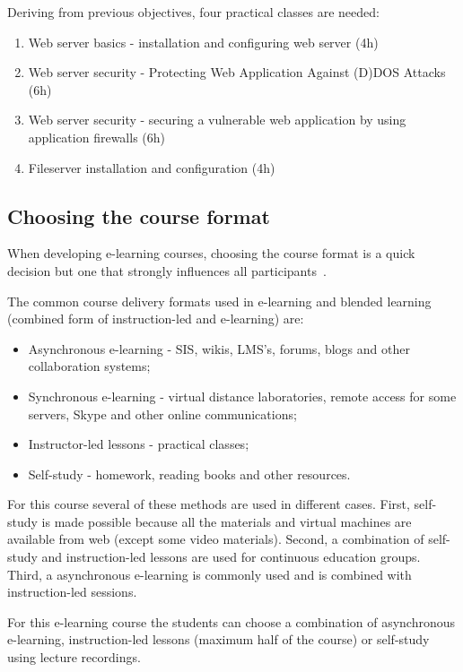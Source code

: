 Deriving from previous objectives, four practical classes are needed:
\begin{enumerate}[label=LAB \arabic*.,leftmargin=*]
   \item Web server basics - installation and configuring web server (4h)
  	\item Web server security - Protecting Web Application Against (D)DOS Attacks (6h)
  	\item Web server security - securing a vulnerable web application by using application firewalls (6h)
  	\item Fileserver installation and configuration (4h)
\end{enumerate}


\subsection{Choosing the course format}

When developing e-learning courses, choosing the course format is a quick decision but one that strongly influences all participants~\citep[p.14]{OppeArenduskeskus2010}. 

The common course delivery formats used in e-learning and blended learning (combined form of instruction-led and e-learning) are: 
\begin{itemize}
\item Asynchronous e-learning - \gls{SIS}, wikis, \gls{LMS}'s, forums, blogs and other collaboration systems;
\item Synchronous e-learning - virtual distance laboratories, remote access for some servers, Skype and other online communications;
\item Instructor-led lessons - practical classes;
\item Self-study - homework, reading books and other resources.
\end{itemize}

For this course several of these methods are used in different cases. First, self-study is made possible because all the materials and virtual machines are available from web (except some video materials). Second, a combination of self-study and instruction-led lessons are used for continuous education groups. Third, a asynchronous e-learning is commonly used and is combined with instruction-led sessions.

For this e-learning course the students can choose a combination of asynchronous e-learning, instruction-led lessons (maximum half of the course) or self-study using lecture recordings.

